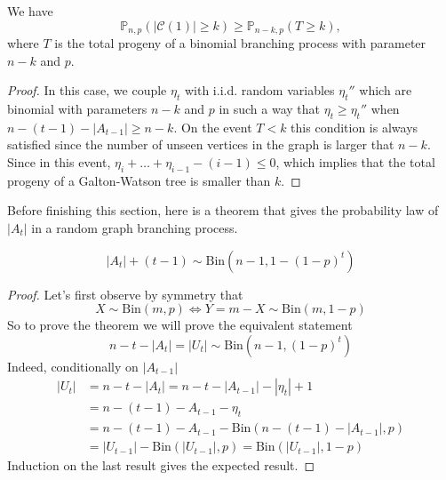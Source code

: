 \begin{theorem}\label{th:lowbin}
	We have
	\begin{equation}
		\mathbb{P}_{n,p}(|\mathcal{C}(1)| \geq k) \geq \mathbb{P}_{n-k,p}(T\geq k),
	\end{equation}
	where $T$ is the total progeny of a binomial branching process with parameter $n-k$ and $p$.
\end{theorem}
\begin{proof}
	In this case, we couple $\eta_t$ with i.i.d. random variables $\eta_t''$ which are binomial with parameters $n-k$ and $p$ in such a way that $\eta_t \geq \eta_t''$ when $n-(t-1)-|A_{t-1}| \geq n-k$.
	On the event $T<k$ this condition is always satisfied since the number of unseen vertices in the graph is larger that $n-k$. 
	Since in this event, $\eta_i + \ldots + \eta_{i-1} - (i-1) \leq 0$, which implies that the total progeny of a Galton-Watson tree is smaller than $k$.
\end{proof}
Before finishing this section, here is a theorem that gives the probability law of $|A_t|$ in a random graph branching process.
\begin{theorem}\label{th:Atlaw}
	\begin{equation}
		|A_t| + (t-1) \sim \text{Bin}(n-1, 1 - (1-p)^t)
	\end{equation}
\end{theorem}
\begin{proof}
	Let's first observe by symmetry that 
	\begin{equation}
		X \sim \text{Bin}(m, p) \iff Y = m-X \sim \text{Bin}(m, 1-p)
	\end{equation}
	So to prove the theorem we will prove the equivalent statement
	\begin{equation}
		n-t-|A_t| = |U_t| \sim \text{Bin}(n-1, (1-p)^t)
	\end{equation}
	Indeed, conditionally on $|A_{t-1}|$
	\begin{align}
		|U_t| &= n - t - |A_t| = n - t - |A_{t-1}| - |\eta_t| + 1 \\
		      &= n - (t-1) - A_{t-1} -\eta_t \\
		      &= n - (t-1) - A_{t-1} - \text{Bin}(n-(t-1)-|A_{t-1}|, p)\\
		      &=|U_{t-1}| - \text{Bin}(|U_{t-1}|, p) = \text{Bin}(|U_{t-1}|, 1-p)
	\end{align}
	Induction on the last result gives the expected result.
\end{proof}

